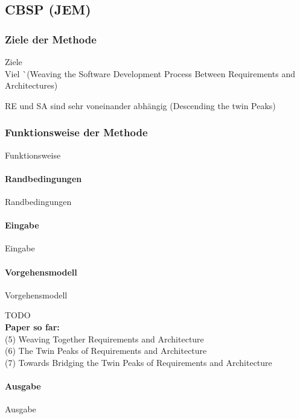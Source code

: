\subsection{CBSP (JEM)}\label{cbsp}

\subsubsection{Ziele der Methode}

Ziele \\

Viel ^^ (Weaving the Software Development Process Between Requirements and Architectures)

RE und SA sind sehr voneinander abhängig (Descending the twin Peaks)

\subsubsection{Funktionsweise der Methode}

Funktionsweise

\paragraph{Randbedingungen}

Randbedingungen


\paragraph{Eingabe}

Eingabe


\paragraph{Vorgehensmodell}

Vorgehensmodell

TODO \\


\textbf{Paper so far:} \\
(5) Weaving Together Requirements and Architecture \\
(6) The Twin Peaks of Requirements and Architecture \\
(7) Towards Bridging the Twin Peaks of Requirements and Architecture \\


\paragraph{Ausgabe}

Ausgabe
